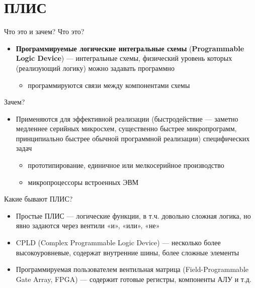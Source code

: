 \documentclass[xetex,aspectratio=43]{beamer}
\begin{document}
\section{ПЛИС}

\begin{frame}{Что это и зачем?}
        Что это?

        \begin{itemize}
            \tightlist
            \item
            \textbf{Программируемые логические интегральные схемы}
            (\textbf{Programmable Logic Device}) --- интегральные схемы,
            физический уровень которых (реализующий логику) можно задавать
            программно

            \begin{itemize}
                \tightlist
                \item
                программируются связи между компонентами схемы
            \end{itemize}
        \end{itemize}

        Зачем?

        \begin{itemize}
            \tightlist
            \item
            Применяются для эффективной реализации (быстродействие --- заметно
            медленнее серийных микросхем, существенно быстрее микропрограмм,
            принципиально быстрее обычной программной реализации) специфических
            задач

            \begin{itemize}
                \tightlist
                \item
                прототипирование, единичное или мелкосерийное производство
                \item
                микропроцессоры встроенных ЭВМ
            \end{itemize}
        \end{itemize}
\end{frame}

\begin{frame}{Какие бывают ПЛИС?}
        \begin{itemize}
            \tightlist
            \item
            Простые ПЛИС --- логические функции, в т.ч. довольно сложная логика,
            но явно задаются через вентили «и», «или», «не»
            \item
            CPLD (Complex Programmable Logic Device) --- несколько более
            высокоуровневые, содержат внутренние шины, более сложные элементы
            \item
            Программируемая пользователем вентильная матрица (Field-Programmable
            Gate Array, FPGA) --- содержит готовые регистры, компоненты АЛУ и т.д.
        \end{itemize}
\end{frame}
\end{document}
